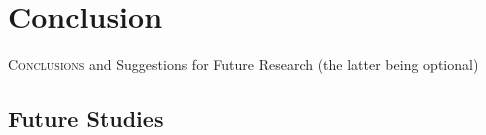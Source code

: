 \chapter*{Conclusion}
\label{ch:conclusion}


\lettrine[lines=\iniciale]{\textcolor{\accentcolor}{C}}{onclusions} and Suggestions for Future Research (the latter being optional)




\section{Future Studies}
\label{sec:future_study}